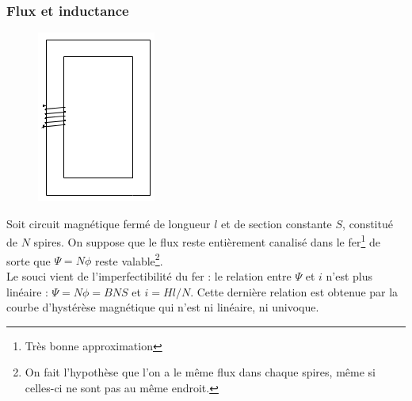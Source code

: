 		\subsubsection{Flux et inductance}
		\begin{figure}
		\vspace{-5mm}
		\includegraphics[scale=0.4]{ch3/image4.png}
		\end{figure}
		Soit circuit magnétique fermé de longueur $l$ et de section 
		constante $S$, constitué de $N$ spires. On suppose que le flux
		reste entièrement canalisé dans le fer\footnote{Très bonne 
		approximation} de sorte que $\Psi = N\phi$ reste valable\footnote{On 
		fait l'hypothèse que l'on a le même flux dans chaque spires, même si 
		celles-ci ne sont pas au même endroit.}.\\
		Le souci vient de l'imperfectibilité du fer : le relation entre 
		$\Psi$ et $i$ n'est plus linéaire : $\Psi = N\phi = BNS$ et 
		$i= H l/N$. Cette dernière relation est obtenue par la courbe 
		d'hystérèse magnétique qui n'est ni linéaire, ni univoque.\\
		
